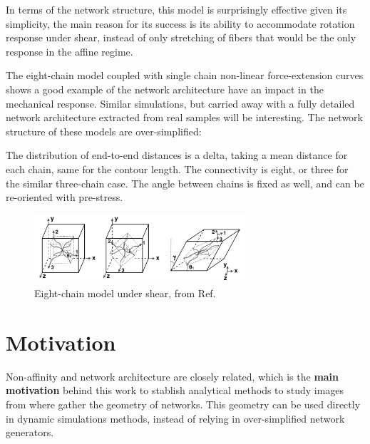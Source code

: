In terms of the network structure, this model is surprisingly effective given its simplicity, the main reason for its success is its ability to accommodate rotation response under shear, instead of only stretching of fibers that would be the only response in the affine regime.

The eight-chain model coupled with single chain non-linear force-extension curves shows a good example of the network architecture have an impact in the mechanical response. Similar simulations, but carried away with a fully detailed network architecture extracted from real samples will be interesting. The network structure of these models are over-simplified:

The distribution of end-to-end distances is a delta, taking a mean distance for each chain, same for the contour length.
The connectivity is eight, or three for the similar three-chain case.
The angle between chains is fixed as well, and can be re-oriented with pre-stress.


\begin{figure}[ht]
  \centering
  \includegraphics[width=0.7\textwidth]{Figures/chapter-intro/eight_chain_shear_nolabels.png}
  \caption{Eight-chain model under shear, from Ref. \citep{palmer_constitutive_2008} }
  \label{fig:eight_chain_shear}
\end{figure}



\section{Motivation}%
\label{sec:motivation-intro}
Non-affinity and network architecture are closely related, which
is the \textbf{main motivation} behind this work to stablish analytical methods to study images
from where gather the geometry of networks. This geometry can be used directly in dynamic simulations methods, instead of relying in over-simplified network generators.

